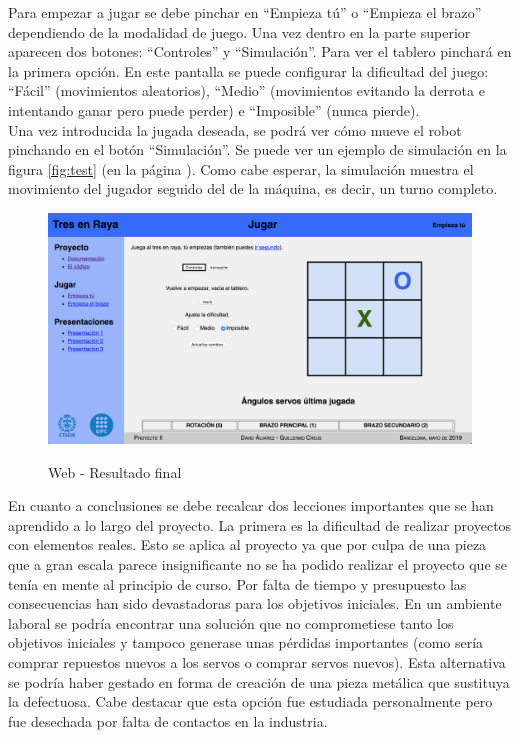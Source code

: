 \documentclass[11pt]{article}
\begin{document}
Para empezar a jugar se debe pinchar en ``Empieza tú'' o ``Empieza el brazo''
dependiendo de la modalidad de juego. Una vez dentro en la parte superior
aparecen dos botones: ``Controles'' y ``Simulación''. Para ver el tablero pinchará en la primera opción. En este pantalla se puede configurar la
dificultad del juego: ``Fácil'' (movimientos aleatorios), ``Medio'' (movimientos
evitando la derrota e intentando ganar pero puede perder) e ``Imposible'' (nunca
pierde). \\

Una vez introducida la jugada deseada, se podrá ver cómo mueve el robot
pinchando en el botón ``Simulación''. Se puede ver un ejemplo de simulación en
la figura \ref{fig:test} (en la página \pageref{fig:test}). Como cabe esperar,
la simulación muestra el movimiento del jugador seguido del de la máquina, es
decir, un turno completo. \\

\begin{figure}[htbp]
  \centering
  \href{https://alvarezrosa.com/proyecto/}{\includegraphics[width = 150mm]{Resultado_final.png}}
  \caption{Web - Resultado final}
  \label{fig:web_res_final}
\end{figure}

En cuanto a conclusiones se debe recalcar dos lecciones importantes que se han
aprendido a lo largo del proyecto. La primera es la dificultad de realizar
proyectos con elementos reales. Esto se aplica al proyecto ya que por culpa de
una pieza que a gran escala parece insignificante no se ha podido realizar el
proyecto que se tenía en mente al principio de curso. Por falta de tiempo y
presupuesto las consecuencias han sido devastadoras para los objetivos
iniciales. En un ambiente laboral se podría encontrar una solución que no
comprometiese tanto los objetivos iniciales y tampoco generase unas pérdidas
importantes (como sería comprar repuestos nuevos a los servos o comprar servos nuevos). Esta alternativa se podría haber
gestado en forma de creación de una pieza metálica que sustituya la
defectuosa. Cabe destacar que esta opción fue estudiada personalmente pero fue
desechada por falta de contactos en la industria. \\
\end{document}
